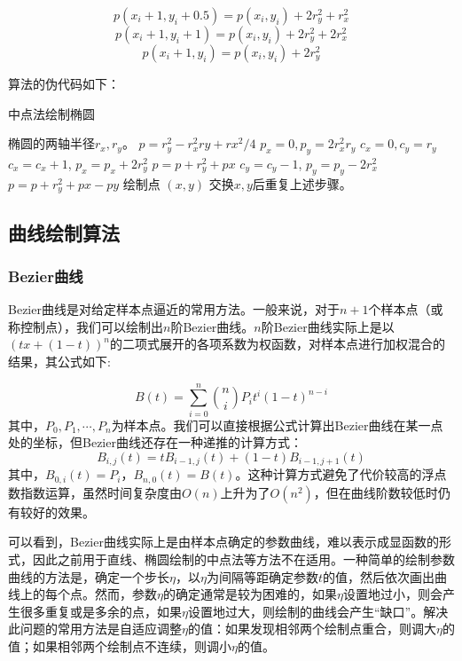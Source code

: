 \documentclass[a4paper,12pt]{article}
\begin{document}
$$ p(x_i+1, y_i+0.5) = p(x_i, y_i) + 2r_y^2 + r_x^2 $$
$$ p(x_i+1, y_i+1) = p(x_i, y_i) + 2r_y^2 + 2r_x^2 $$
$$ p(x_i+1, y_i) = p(x_i, y_i) + 2r_y^2 $$

算法的伪代码如下：

\begin{algorithm}[htb] 
	\caption{中点法绘制椭圆} 
	\label{alg:DDA} 
	\begin{algorithmic}[1] 
		\Require 
		椭圆的两轴半径$r_x, r_y$。
		\State $p = r_y^2 - r_x^2 ry + rx^2 / 4$
		\State $p_x = 0, p_y = 2r_x^2r_y$
		\State $c_x = 0, c_y = r_y$
		\State $c_x = c_x + 1$, $p_x = p_x + 2 r_y^2$ 
		\State $p = p + r_y^2 + px$
		\Else
		\State $c_y = c_y - 1$, $p_y = p_y - 2 r_x^2$
		\State $p = p + r_y^2 + px - py$
		\EndIf
		\State 绘制点 $(x, y)$
		\EndWhile
		\State 交换$x, y$后重复上述步骤。
	\end{algorithmic} 
\end{algorithm}

\subsection{曲线绘制算法}
\subsubsection{Bezier曲线}
Bezier曲线是对给定样本点逼近的常用方法。一般来说，对于$n+1$个样本点（或称控制点），我们可以绘制出$n$阶Bezier曲线。$n$阶Bezier曲线实际上是以$(tx+(1-t))^n$的二项式展开的各项系数为权函数，对样本点进行加权混合的结果，其公式如下:

$$ B(t) = \sum_{i=0}^n \binom{n}{i} P_i t^i (1-t)^{n-i} $$
其中，$P_0, P_1, \cdots, P_n$为样本点。我们可以直接根据公式计算出Bezier曲线在某一点处的坐标，但Bezier曲线还存在一种递推的计算方式：
$$ B_{i, j}(t) = t B_{i-1, j}(t) + (1-t) B_{i-1, j+1}(t) $$
其中，$B_{0, i}(t) = P_i$，$B_{n, 0}(t) = B(t)$。这种计算方式避免了代价较高的浮点数指数运算，虽然时间复杂度由$O(n)$上升为了$O(n^2)$，但在曲线阶数较低时仍有较好的效果。

可以看到，Bezier曲线实际上是由样本点确定的参数曲线，难以表示成显函数的形式，因此之前用于直线、椭圆绘制的中点法等方法不在适用。一种简单的绘制参数曲线的方法是，确定一个步长$\eta$，以$\eta$为间隔等距确定参数$t$的值，然后依次画出曲线上的每个点。然而，参数$\eta$的确定通常是较为困难的，如果$\eta$设置地过小，则会产生很多重复或是多余的点，如果$\eta$设置地过大，则绘制的曲线会产生“缺口”。解决此问题的常用方法是自适应调整$\eta$的值：如果发现相邻两个绘制点重合，则调大$\eta$的值；如果相邻两个绘制点不连续，则调小$\eta$的值。
\end{document}

